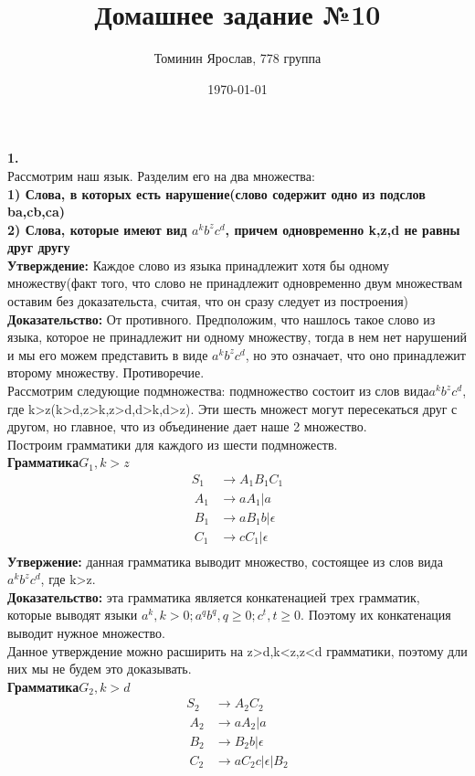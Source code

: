 \documentclass[a4paper,12pt]{article}
\author{Томинин Ярослав, 778 группа}
\title{Домашнее задание №10}
\date{\today}
\begin{document}
 

\maketitle
\newpage
\textbf{1.}\\
Рассмотрим наш язык. Разделим его на два множества:\\
\textbf{1) Слова, в которых есть нарушение(слово содержит одно из подслов ba,cb,ca)}\\
\textbf{2) Слова, которые имеют вид $a^kb^zc^d$, причем одновременно k,z,d не равны друг другу}\\
\textbf{Утверждение:} Каждое слово из языка принадлежит хотя бы одному множеству(факт того, что слово не принадлежит одновременно двум множествам оставим без доказательста, считая, что он сразу следует из построения)\\
\textbf{Доказательство:} От противного. Предположим, что нашлось такое слово из языка, которое не принадлежит ни одному множеству, тогда в нем нет нарушений и мы его можем представить в виде $a^kb^zc^d$, но это означает, что оно принадлежит второму множеству. Противоречие.\\
Рассмотрим следующие подмножества: подмножество состоит из слов вида$a^kb^zc^d$, где k>z(k>d,z>k,z>d,d>k,d>z). Эти шесть множест могут пересекаться друг с другом, но главное, что из объединение дает наше 2 множество.\\
Построим грамматики для каждого из шести подмножеств.\\
\textbf{Грамматика$ G_1,k>z$}
\begin{align*}
	S_1&\to A_1B_1C_1\\\
	A_1&\to aA_1|a\\\
	B_1&\to aB_1b|\epsilon\\\
	C_1&\to cC_1|\epsilon\\\
\end{align*}
\textbf{Утвержение:} данная грамматика выводит множество, состоящее из слов вида$a^kb^zc^d$, где k>z.\\
\textbf{Доказательство:} эта грамматика является конкатенацией трех грамматик, которые выводят языки $a^k, k>0; a^qb^q,q \geq 0; c^t,t \geq 0$. Поэтому их конкатенация выводит нужное множество.\\
Данное утверждение можно расширить на z>d,k<z,z<d грамматики, поэтому дли них мы не будем это доказывать.\\
\textbf{Грамматика$ G_2,k>d$}
\begin{align*}
	S_2&\to A_2C_2\\\
	A_2&\to aA_2|a\\\
	B_2&\to B_2b|\epsilon\\\
	C_2&\to aC_2c|\epsilon|B_2\\\
\end{align*}
\end{document}

